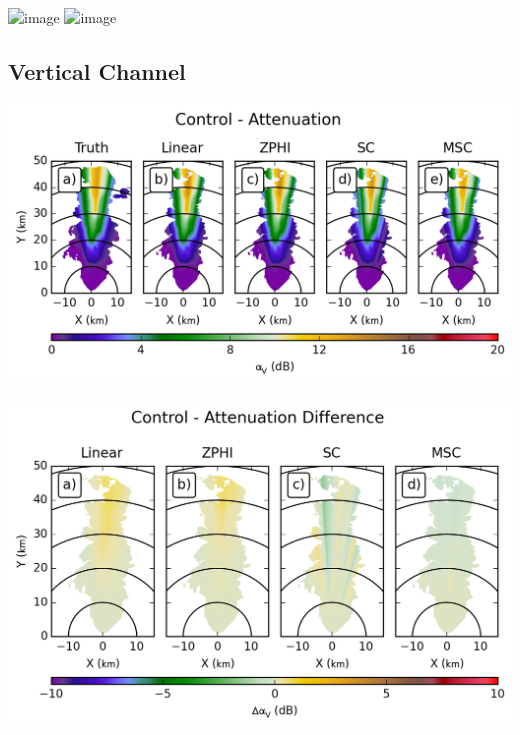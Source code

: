 \documentclass[red]{beamer}
\begin{document}
\begin{frame}
    \begin{center}
        \includegraphics<1>[scale=0.7]{figures/X_Combined_Specific_Differential_Attenuation_scatter}
        \includegraphics<2>[scale=0.7]{figures/X_Control_Specific_Differential_Attenuation_scatter}
    \end{center}
\end{frame}

\subsection{Vertical Channel}
\begin{frame}
    \begin{center}
        \includegraphics[scale=0.7]{figures/C_Control_Attenuation_V}
    \end{center}
\end{frame}

\begin{frame}
    \begin{center}
        \includegraphics[scale=0.7]{figures/C_Control_Attenuation_Difference_V}
    \end{center}
\end{frame}
\end{document}
